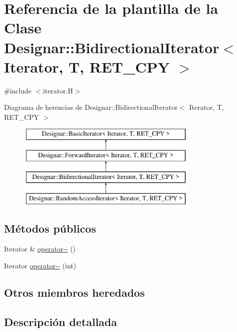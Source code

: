 \hypertarget{class_designar_1_1_bidirectional_iterator}{}\section{Referencia de la plantilla de la Clase Designar\+:\+:Bidirectional\+Iterator$<$ Iterator, T, R\+E\+T\+\_\+\+C\+PY $>$}
\label{class_designar_1_1_bidirectional_iterator}


{\ttfamily \#include $<$iterator.\+H$>$}

Diagrama de herencias de Designar\+:\+:Bidirectional\+Iterator$<$ Iterator, T, R\+E\+T\+\_\+\+C\+PY $>$\begin{figure}[H]
\begin{center}
\leavevmode
\includegraphics[height=4.000000cm]{class_designar_1_1_bidirectional_iterator}
\end{center}
\end{figure}
\subsection*{Métodos públicos}
\begin{DoxyCompactItemize}
\item 
Iterator \& \hyperlink{class_designar_1_1_bidirectional_iterator_aac9847e9868e270c4266a6fa0323a6ef}{operator-\/-\/} ()
\item 
Iterator \hyperlink{class_designar_1_1_bidirectional_iterator_a71602759debbdd18c89ffddb2217acb3}{operator-\/-\/} (int)
\end{DoxyCompactItemize}
\subsection*{Otros miembros heredados}


\subsection{Descripción detallada}
